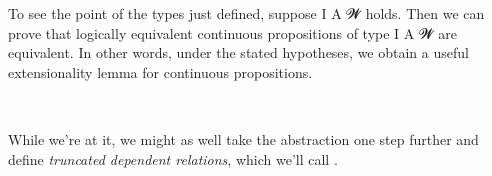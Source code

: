 To see the point of the types just defined, suppose  \ab I \ab A \ab 𝓦 holds. Then we can prove that logically equivalent continuous propositions of type  \ab I \ab A \ab 𝓦 are equivalent. In other words, under the stated hypotheses, we obtain a useful extensionality lemma for continuous propositions.
\ccpad
\begin{code}%
\>[1]\AgdaSpace{}%
\AgdaSymbol{:}\AgdaSpace{}%
\AgdaSpace{}%
\AgdaSpace{}%
\AgdaSpace{}%
\AgdaSpace{}%
\AgdaSymbol{\{}\AgdaSpace{}%
\AgdaSpace{}%
\AgdaSymbol{:}\AgdaSpace{}%
\AgdaSpace{}%
\AgdaSpace{}%
\AgdaSymbol{\}}\AgdaSpace{}%
\AgdaSpace{}%
\AgdaSpace{}%
\AgdaSpace{}%
\AgdaSpace{}%
\AgdaSpace{}%
\AgdaSpace{}%
\AgdaSpace{}%
\AgdaSpace{}%
\AgdaSpace{}%
\AgdaSpace{}%
\AgdaSpace{}%
\<%
\\
%
\>[1]\AgdaSpace{}%
\AgdaSpace{}%
\AgdaSpace{}%
\AgdaSymbol{=}\AgdaSpace{}%
%
\>[32]\AgdaSpace{}%
\AgdaSpace{}%
%
\>[41]\AgdaSpace{}%
\AgdaSpace{}%
\<%
\end{code}
\ccpad
While we're at it, we might as well take the abstraction one step further and define \emph{truncated dependent relations}, which we'll call .
\ccpad
